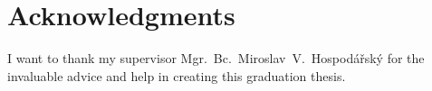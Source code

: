 ﻿\vfill

\section*{Acknowledgments}
I want to thank my supervisor Mgr.~Bc.~Miroslav~V.~Hospodářský for the invaluable advice and help in creating this graduation thesis.

\vglue 2cm $ $


